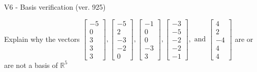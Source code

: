 \begin{exercise}
  \begin{exerciseTitle}V6 - Basis verification (ver. 925)\end{exerciseTitle}
  \begin{exerciseStatement}
    Explain why the vectors \(\left[\begin{array}{r}
-5 \\
0 \\
3 \\
3 \\
3
\end{array}\right] , \left[\begin{array}{r}
-5 \\
2 \\
-3 \\
-2 \\
0
\end{array}\right] , \left[\begin{array}{r}
-1 \\
0 \\
0 \\
-3 \\
3
\end{array}\right] , \left[\begin{array}{r}
-3 \\
-5 \\
-2 \\
-2 \\
-1
\end{array}\right] , \text{ and } \left[\begin{array}{r}
4 \\
2 \\
-4 \\
4 \\
4
\end{array}\right]\) are or are not a basis of \(\mathbb{R}^5\)	



\end{exerciseStatement}
\end{exercise}
